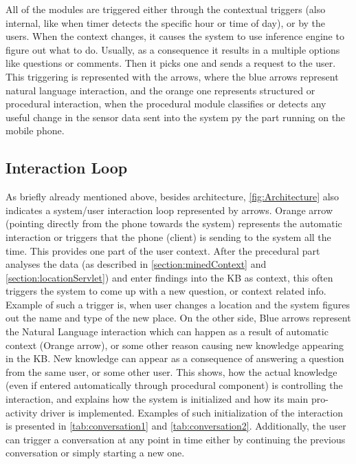 All of the modules are triggered either through the contextual triggers 
(also internal, like when timer detects the specific hour or time of day), or
by the users. When the context changes, it causes the system to use inference
engine to figure out what to do. Usually, as a consequence it results in a 
multiple options like questions or comments. Then it picks one and sends a 
request to the user. This triggering is represented with the arrows, where the 
blue arrows represent natural language interaction, and the orange one
represents structured or procedural interaction, when the procedural module
classifies or detects any useful change in the sensor data sent into the system
py the part running on the mobile phone.

\subsection{Interaction Loop}
\label{section:interaction}
As briefly already mentioned above, besides architecture, 
\autoref{fig:Architecture} also indicates a system/user interaction loop 
represented by arrows. Orange arrow (pointing 
directly from the phone towards the system) represents the automatic interaction
or triggers that the phone (client) is sending to the system all the time. This
provides one part of the user context. After the precedural part analyses
the data (as described in \autoref{section:minedContext} and 
\autoref{section:locationServlet}) and enter findings into the KB as 
context, this often triggers the system to come up with a new question, or 
context related info. Example of such a trigger is, when user changes a location
and the system figures out the name and type of the new place. On the other 
side, Blue arrows represent the Natural Language interaction which can happen
as a result of automatic context (Orange arrow), or some other reason causing new 
knowledge appearing in the KB. New knowledge can appear as a consequence of
answering a question from the same user, or some other user. This shows, how the
actual knowledge (even if entered automatically through procedural component) is
controlling the interaction, and explains how the system is initialized and how
its main pro-activity driver is implemented. Examples of such initialization
of the interaction is presented in \autoref{tab:conversation1} and
\autoref{tab:conversation2}. Additionally, the 
user can trigger a conversation at any point in time either by continuing the 
previous conversation or simply starting a new one. 

